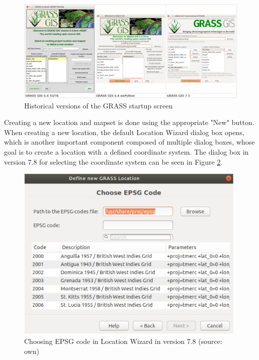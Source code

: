\documentclass[a4paper,10pt,twoside]{article}
\begin{document}
\vspace{0.3cm}
\begin{figure}[hbt!]
\begin{center}
\includegraphics[width=15cm]{../pictures/verze_startup.png} 
\caption[Historical versions of the GRASS startup screen]{Historical versions of the GRASS startup screen}
\label{fig:verze_startup}
\end{center}
\end{figure}

Creating a new location and mapset is done using the appropriate "New" button. When creating a new location, the default Location Wizard dialog box opens, which is another important component composed of multiple dialog boxes, whose goal is to create a location with a defined coordinate system. The dialog box in version 7.8 for selecting the coordinate system can be seen in Figure \ref{fig:loc_wizard_sour_pred}.

\vspace{0.3cm}
\begin{figure}[hbt!]
\begin{center}
\includegraphics[width=11cm]{../pictures/loc_wizard_sour_pred.png} 
\caption[Choosing EPSG code in Location Wizard in version 7.8]{Choosing EPSG code in Location Wizard in version 7.8 (source: own)}
\label{fig:loc_wizard_sour_pred}
\end{center}
\end{figure}
\end{document}
